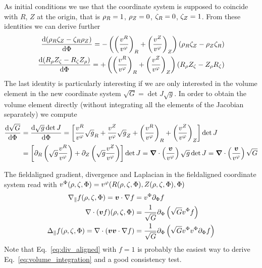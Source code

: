 As initial conditions we use that the coordinate system is supposed to coincide with $R$, $Z$
at the origin, that is ${\rho}_R = 1$, ${\rho}_Z = 0$, ${\zeta}_R = 0$, ${\zeta}_Z = 1$.
From these identities we can derive further
\begin{align}
\frac{\mathrm{d} ({\rho}_R {\zeta}_Z - {\zeta}_R {\rho}_Z)}{\mathrm{d}{\Phi}} =
- \left(\left(\frac{v^R}{v^\varphi}\right)_R
      + \left(\frac{v^Z}{v^\varphi}\right)_Z\right) ( {\rho}_R{\zeta}_Z - {\rho}_Z{\zeta}_R) \\
\frac{\mathrm{d}  (R_{\rho} Z_{\zeta} - R_{\zeta} Z_{\rho})}{\mathrm{d}{\Phi}} =
+\left(\left(\frac{v^R}{v^\varphi}\right)_R
      +\left(\frac{v^Z}{v^\varphi}\right)_Z\right) ( R_{\rho} Z_{\zeta} - Z_{\rho} R_{\zeta})
\end{align}
The last identity is particularly interesting if we are only interested in the volume element in the
new coordinate system $\sqrt{G} = \det J \sqrt{g}$.
In order to obtain the volume element directly (without integrating all the
elements of the Jacobian separately) we compute
\begin{align}
\frac{\mathrm{d} \sqrt{G}}{\mathrm{d}{\Phi}} &=
\frac{\mathrm{d} \sqrt{g}\det J}{\mathrm{d}{\Phi}} =
\left[\frac{v^R}{v^\varphi}\sqrt{g}_R + \frac{v^Z}{v^\varphi}\sqrt{g}_Z + \left(\frac{v^R}{v^\varphi}\right)_R
      +\left(\frac{v^Z}{v^\varphi}\right)_Z\right]\det J \nonumber\\
      &= \left[\partial_R\left( \sqrt{g}\frac{v^R}{v^\varphi}\right) + \partial_Z\left(\sqrt{g}\frac{v^Z}{v^\varphi}\right) \right]\det J
          = {\boldsymbol{\nabla}}\cdot\left(\frac{{\boldsymbol{v}}}{v^\varphi}\right) \sqrt{g}\det J = {\boldsymbol{\nabla}}\cdot\left(\frac{{\boldsymbol{v}}}{v^\varphi}\right)\sqrt{G}
\label{eq:volume_integration}
\end{align}

The fieldaligned gradient, divergence and Laplacian in the fieldaligned coordinate system read
with $v^{\Phi}({\rho},{\zeta},{\Phi}) = v^\varphi( R({\rho},{\zeta},{\Phi}), Z({\rho},{\zeta},{\Phi}), {\Phi})$
\begin{align}
\nabla_\parallel f ({\rho},{\zeta},{\Phi}) =  {\boldsymbol{v}} \cdot\nabla f &= v^{\Phi}\partial_{\Phi} f \\
\nabla\cdot ({\boldsymbol{v}} f) ({\rho},{\zeta},{\Phi}) &=  \frac{1}{\sqrt{G}} \partial_{\Phi}\left(\sqrt{G} v^{\Phi} f \right)\label{eq:div_aligned}\\
\Delta_\parallel f ({\rho},{\zeta},{\Phi}) =  \nabla\cdot ({\boldsymbol{v}}{\boldsymbol{v}}\cdot \nabla f)  &= \frac{1}{\sqrt{G}}
    \partial_{\Phi}\left(\sqrt{G} v^{\Phi} v^{\Phi} \partial_{\Phi} f\right)
\end{align}
Note that Eq.~\eqref{eq:div_aligned} with $f=1$ is probably the easiest way to derive Eq.~\eqref{eq:volume_integration}
and a good consistency test.
